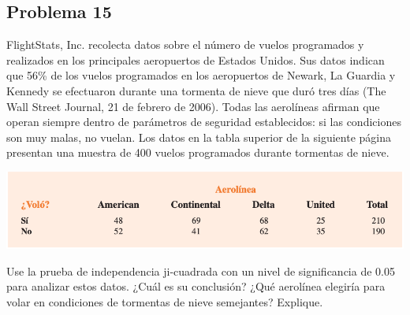 \documentclass[a4paper,12pt]{article}
\begin{document}
\subsection{Problema 15} 

FlightStats, Inc. recolecta datos sobre el número de vuelos programados y realizados en los principales aeropuertos de Estados Unidos. Sus datos indican que 56\% de los vuelos programados en los aeropuertos de Newark, La Guardia y Kennedy se efectuaron durante una tormenta de nieve que duró tres días (The Wall Street Journal, 21 de febrero de 2006). Todas las aerolíneas afirman que operan siempre dentro de parámetros de seguridad establecidos: si las condiciones son muy malas, no vuelan. Los datos en la tabla superior de la siguiente página presentan una muestra de 400 vuelos programados durante tormentas de nieve.
\begin{center}
    \includegraphics[scale=0.5]{images/Screen Shot 2021-05-11 at 00.03.21.png}
\end{center}

Use la prueba de independencia ji-cuadrada con un nivel de significancia de 0.05 para analizar estos datos. ¿Cuál es su conclusión? ¿Qué aerolínea elegiría para volar en condiciones de tormentas de nieve semejantes? Explique.
\end{document}
